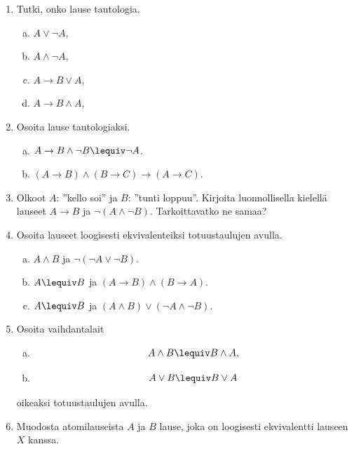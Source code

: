 


\Harjoitustehtavat

\begin{enumerate}
\item Tutki, onko lause tautologia.
\begin{enumerate}[a)]
\item $A\lor \lnot A$,
\item $A \land \lnot A$,
\item $A \to B \lor A$,
\item $A \to B \land A$,
\end{enumerate}

\item Osoita lause tautologiaksi.
\begin{enumerate}[a)]
\item $A\to B\land \lnot B \lequiv \lnot A$.
\item $(A\to B) \land (B\to C)\to (A\to C)$.
\end{enumerate}

\item Olkoot $A$: ''kello soi'' ja $B$: ''tunti loppuu''.
Kirjoita luonnollisella kielellä lauseet $A\to B$ ja
$\lnot(A \land \lnot B )$. Tarkoittavatko ne samaa?

\item Osoita lauseet loogisesti ekvivalenteiksi
totuustaulujen avulla.
\begin{enumerate}[a)]
\item $A\land B$ ja $\lnot(\lnot A\lor \lnot B )$.
\item $A\lequiv B$ ja $(A\to B)\land (B \to A)$.
\item $A\lequiv B$ ja $(A\land B) \lor (\lnot A\land
\lnot B )$.
\end{enumerate}

\item Osoita vaihdantalait
\begin{enumerate}[a)]
\item
\[
A \land B \lequiv B \land A,
\]
\item
\[
A \lor B \lequiv B \lor A
\]
\end{enumerate}
oikeaksi totuustaulujen avulla.

\item Muodosta atomilauseista $A$ ja $B$ lause, joka on
loogisesti ekvivalentti lauseen $X$ kanssa.


\end{enumerate}
